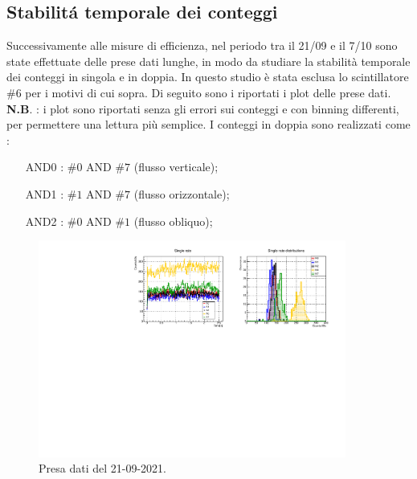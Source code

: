 \documentclass[11pt,a4paper]{article}
\begin{document}
\subsection{Stabilit\'a temporale dei conteggi}
Successivamente alle misure di efficienza, nel periodo tra il 21/09 e il 7/10 sono state effettuate delle prese dati lunghe, in modo da studiare la stabilità temporale dei conteggi in singola e in doppia. In questo studio è stata esclusa lo scintillatore $\#6$ per i motivi di cui sopra. Di seguito sono i riportati i plot delle prese dati. \textbf{N.B}. : i plot sono riportati senza gli errori sui conteggi e con binning differenti, per permettere una lettura più semplice. I conteggi in doppia sono realizzati come :
\begin{itemize}
\item[AND0] : $\#0$ AND $\#7$ (flusso verticale);
\item[AND1] : $\#1$ AND $\#7$ (flusso orizzontale);
\item[AND2] : $\#0$ AND $\#1$ (flusso obliquo);
\end{itemize}
\begin{figure}
\includegraphics[width=0.9\textwidth]{Immagini/20210921.pdf}
\caption{Presa dati del 21-09-2021.}
\end{figure}  
\end{document}
